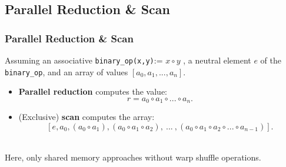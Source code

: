 \documentclass{beamer}
\begin{document}
\subsection{Parallel Reduction \& Scan}
\begin{frame}
\frametitle{Parallel Reduction \& Scan}
Assuming an associative \texttt{binary\_op(x,y)}:= $x \circ y$ , a neutral element $e$ of the \texttt{binary\_op}, and an array of values $\left[a_0,a_1, ... ,a_n\right]$.\\\vspace{10}
\begin{itemize}
  \item \textbf{Parallel reduction} computes the value:
\begin{equation}
  r = a_0 \circ a_1 \circ ... \circ a_n.
\end{equation}
\item (Exclusive) \textbf{scan} computes the array:
\begin{equation}
  \left[e , a_0 , \left(a_0 \circ a_1\right), \left(a_0 \circ a_1 \circ a_2\right), \ ... \ ,\left(a_0\circ a_1 \circ a_2 \circ ...\circ a_{n-1}\right)\right].
\end{equation}
\end{itemize}
\\\vspace{5}
Here, only shared memory approaches without warp shuffle operations.
\end{frame}
\end{document}
